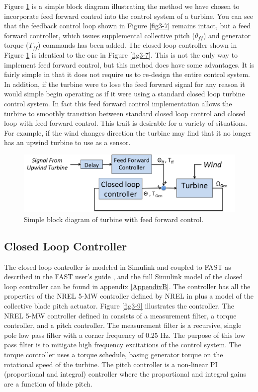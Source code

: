 Figure \ref{fig3-8} is a simple block diagram illustrating the method we have chosen  to incorporate feed forward control into the control system of a turbine. You can see that the feedback control loop shown in Figure \ref{fig3-7} remains intact, but a feed forward controller, which issues supplemental collective pitch ($\theta_{ff}$) and generator torque ($T_{ff}$) commands has been added. The closed loop controller shown in Figure \ref{fig3-8} is identical to the one in Figure \ref{fig3-7}. This is not the only way to implement feed forward control, but this method does have some advantages. It is fairly simple in that it does not require us to re-design the entire control system. In addition, if the turbine were to lose the feed forward signal for any reason it would simple begin operating as if it were using a standard closed loop turbine control system. In fact this feed forward control implementation allows the turbine to smoothly transition between standard closed loop control and closed loop with feed forward control. This trait is desirable for a variety of situations. For example, if the wind changes direction the turbine may find that it no longer has an upwind turbine to use as a sensor.

 \begin{figure}[htbp]
	\centering
		\includegraphics[width=\linewidth]{Figures/ch3Figures/fig3-8.png}
		
	\caption{Simple block diagram of turbine with feed forward control.}
	\label{fig3-8}
\end{figure}

\subsection{Closed Loop Controller}

The closed loop controller is modeled in Simulink and coupled to FAST as described in the FAST user's guide \cite{jonkman2005}, and the full Simulink model of the closed loop controller can be found in appendix \ref{AppendixB}. The controller has all the properties of the NREL 5-MW controller defined by NREL in \cite{jonkman2009} plus a model of the collective blade pitch actuator.  Figure \ref{fig3-9} illustrates the controller. The NREL 5-MW controller defined in \cite{jonkman2009} consists of a measurement filter, a torque controller, and a pitch controller. The measurement filter is a recursive, single pole low pass filter with a corner frequency of 0.25 Hz. The purpose of this low pass filter is to mitigate high frequency excitations of the control system. The torque controller uses a torque schedule, basing generator torque on the rotational speed of the turbine. The pitch controller is a non-linear PI (proportional and integral) controller where the proportional and integral gains are a function of blade pitch. 

